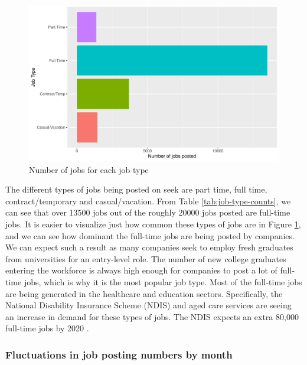 \documentclass[11pt,a4paper,]{article}
\begin{document}
\begin{figure}

{\centering \includegraphics{Team_JHDP_Assignment4_files/figure-latex/job-types-1} 

}

\caption{Number of jobs for each job type}\label{fig:job-types}
\end{figure}

The different types of jobs being posted on seek are part time, full time, contract/temporary and casual/vacation. From Table \ref{tab:job-type-counts}, we can see that over 13500 jobs out of the roughly 20000 jobs posted are full-time jobs. It is easier to visualize just how common these types of jobs are in Figure \ref{fig:job-types}, and we can see how dominant the full-time jobs are being posted by companies. We can expect such a result as many companies seek to employ fresh graduates from universities for an entry-level role. The number of new college graduates entering the workforce is always high enough for companies to post a lot of full-time jobs, which is why it is the most popular job type. Most of the full-time jobs are being generated in the healthcare and education sectors. Specifically, the National Disability Insurance Scheme (NDIS) and aged care services are seeing an increase in demand for these types of jobs. The NDIS expects an extra 80,000 full-time jobs by 2020 \textcite{aigroup}.

\hypertarget{fluctuations-in-job-posting-numbers-by-month}{%
\subsubsection{Fluctuations in job posting numbers by month}\label{fluctuations-in-job-posting-numbers-by-month}}
\end{document}
